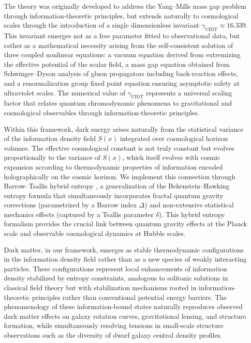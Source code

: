 The theory was originally developed to address the Yang--Mills mass gap problem through information-theoretic principles, but extends naturally to cosmological scales through the introduction of a single dimensionless invariant $\gamma_{\mathrm{UIDT}} \approx 16.339$. This invariant emerges not as a free parameter fitted to observational data, but rather as a mathematical necessity arising from the self-consistent solution of three coupled nonlinear equations: a vacuum equation derived from extremizing the effective potential of the scalar field, a mass gap equation obtained from Schwinger--Dyson analysis of gluon propagators including back-reaction effects, and a renormalization group fixed point equation ensuring asymptotic safety at ultraviolet scales. The numerical value of $\gamma_{\mathrm{UIDT}}$ represents a universal scaling factor that relates quantum chromodynamic phenomena to gravitational and cosmological observables through information-theoretic principles.

Within this framework, dark energy arises naturally from the statistical variance of the information density field $S(x)$ integrated over cosmological horizon volumes. The effective cosmological constant is not truly constant but evolves proportionally to the variance of $S(x)$, which itself evolves with cosmic expansion according to thermodynamic properties of information encoded holographically on the cosmic horizon. We implement this connection through Barrow--Tsallis hybrid entropy \citep{Barrow2020,Tsallis2009}, a generalization of the Bekenstein--Hawking entropy formula that simultaneously incorporates fractal quantum gravity corrections (parametrized by a Barrow index $\Delta$) and non-extensive statistical mechanics effects (captured by a Tsallis parameter $\delta$). This hybrid entropy formalism provides the crucial link between quantum gravity effects at the Planck scale and observable cosmological dynamics at Hubble scales.

Dark matter, in our framework, emerges as stable thermodynamic configurations in the information density field rather than as a new species of weakly interacting particles. These configurations represent local enhancements of information density stabilized by entropy constraints, analogous to solitonic solutions in classical field theory but with stabilization mechanisms rooted in information-theoretic principles rather than conventional potential energy barriers. The phenomenology of these information-bound states naturally reproduces observed dark matter effects on galaxy rotation curves, gravitational lensing, and structure formation, while simultaneously resolving tensions in small-scale structure observations such as the diversity of dwarf galaxy central density profiles.

